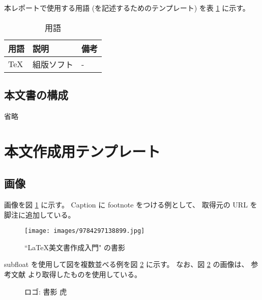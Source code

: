 \documentclass[a4paper]{ltjsarticle}
\begin{document}
本レポートで使用する用語 (を記述するためのテンプレート) を表 \ref{tbl:words} に示す。

\begin{table}[H]
\begin{center}
\caption{用語}
\begin{tabular}{llp{6cm}}
用語 & 説明 & 備考 \\
\hline
\TeX & 組版ソフト & - \\
\end{tabular}
\label{tbl:words}
\end{center}
\end{table}

\subsection{本文書の構成}

省略   

\newpage
\section{本文作成用テンプレート}

\subsection{画像}

画像を図 \ref{fig:bibun9paper} に示す。
Caption に footnote をつける例として、
取得元の URL を脚注に追加している。

\begin{figure}[H]
\begin{center}
        \texttt{[image: images/9784297138899.jpg]}
        \caption{``LaTeX美文書作成入門" \cite{bib:bibun9} の書影 \footnotemark}
        \label{fig:bibun9paper}
\end{center}
\end{figure}

subfloat を使用して図を複数並べる例を図 \ref{fig:subfloats} に示す。
なお、図 \ref{fig:subfloats}  の画像は、
参考文献 \cite{bib:tigereps} より取得したものを使用している。

\begin{figure}[H]
\centering
         \quad
        \captionsetup{format=plain, font=large, margin=50pt}
        \caption{ロゴ:  書影  虎}
        \label{fig:subfloats}
\end{figure}
\end{document}
